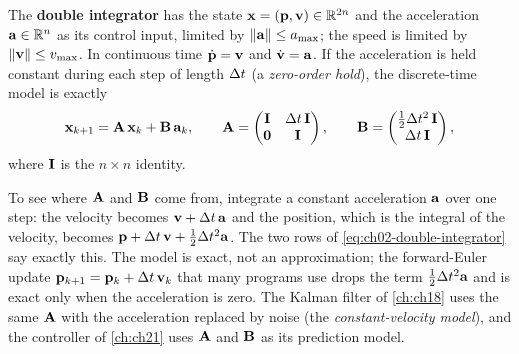 \begin{definition}
\label{def:ch02-double-integrator}
The \textbf{double integrator} has the state $\mathbf{x}=(\mathbf{p},\mathbf{v})\in\mathbb{R}^{2n}$ and the acceleration $\mathbf{a}\in\mathbb{R}^n$ as its control input, limited by $\left\lVert \mathbf{a} \right\rVert\le a_{\max}$; the speed is limited by $\left\lVert \mathbf{v} \right\rVert\le v_{\max}$. In continuous time $\dot{\mathbf{p}}=\mathbf{v}$ and $\dot{\mathbf{v}}=\mathbf{a}$. If the acceleration is held constant during each step of length $\Delta t$ (a \emph{zero-order hold}), the discrete-time model is exactly
\begin{equation}
\mathbf{x}_{k+1}=\mathbf{A}\,\mathbf{x}_k+\mathbf{B}\,\mathbf{a}_k,\qquad
\mathbf{A}=\begin{pmatrix}\mathbf{I}&\Delta t\,\mathbf{I}\\ \mathbf{0}&\mathbf{I}\end{pmatrix},\qquad
\mathbf{B}=\begin{pmatrix}\tfrac12\Delta t^2\,\mathbf{I}\\ \Delta t\,\mathbf{I}\end{pmatrix},
\label{eq:ch02-double-integrator}
\end{equation}
where $\mathbf{I}$ is the $n\times n$ identity.
\end{definition}

To see where $\mathbf{A}$ and $\mathbf{B}$ come from, integrate a constant acceleration $\mathbf{a}$ over one step: the velocity becomes $\mathbf{v}+\Delta t\,\mathbf{a}$ and the position, which is the integral of the velocity, becomes $\mathbf{p}+\Delta t\,\mathbf{v}+\tfrac12\Delta t^2\mathbf{a}$. The two rows of \cref{eq:ch02-double-integrator} say exactly this. The model is exact, not an approximation; the forward-Euler update $\mathbf{p}_{k+1}=\mathbf{p}_k+\Delta t\,\mathbf{v}_k$ that many programs use drops the term $\tfrac12\Delta t^2\mathbf{a}$ and is exact only when the acceleration is zero. The Kalman filter of \cref{ch:ch18} uses the same $\mathbf{A}$ with the acceleration replaced by noise (the \emph{constant-velocity model}), and the controller of \cref{ch:ch21} uses $\mathbf{A}$ and $\mathbf{B}$ as its prediction model.

